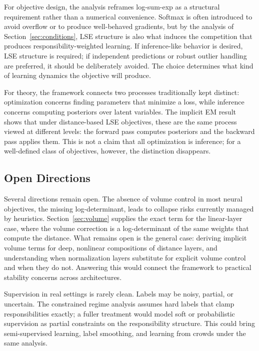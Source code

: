 For objective design, the analysis reframes log-sum-exp as a structural requirement rather than a numerical convenience. Softmax is often introduced to avoid overflow or to produce well-behaved gradients, but by the analysis of Section~\ref{sec:conditions}, LSE structure is also what induces the competition that produces responsibility-weighted learning. If inference-like behavior is desired, LSE structure is required; if independent predictions or robust outlier handling are preferred, it should be deliberately avoided. The choice determines what kind of learning dynamics the objective will produce.

For theory, the framework connects two processes traditionally kept distinct: optimization concerns finding parameters that minimize a loss, while inference concerns computing posteriors over latent variables. The implicit EM result shows that under distance-based LSE objectives, these are the same process viewed at different levels: the forward pass computes posteriors and the backward pass applies them. This is not a claim that all optimization is inference; for a well-defined class of objectives, however, the distinction disappears.

\subsection{Open Directions}

Several directions remain open. The absence of volume control in most neural objectives, the missing log-determinant, leads to collapse risks currently managed by heuristics. Section~\ref{sec:volume} supplies the exact term for the linear-layer case, where the volume correction is a log-determinant of the same weights that compute the distance. What remains open is the general case: deriving implicit volume terms for deep, nonlinear compositions of distance layers, and understanding when normalization layers substitute for explicit volume control and when they do not. Answering this would connect the framework to practical stability concerns across architectures.

Supervision in real settings is rarely clean. Labels may be noisy, partial, or uncertain. The constrained regime analysis assumes hard labels that clamp responsibilities exactly; a fuller treatment would model soft or probabilistic supervision as partial constraints on the responsibility structure. This could bring semi-supervised learning, label smoothing, and learning from crowds under the same analysis.

